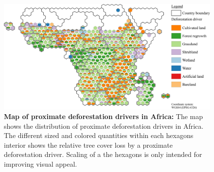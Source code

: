 			\begin{figure}[ht]
				\centering
				\includegraphics[scale=1]{img/africa_driver_frameless}
				\caption[Map of proximate deforestion drivers in Africa]{\textbf{Map of proximate deforestation drivers in Africa:} The map shows the distribution of proximate deforestation drivers in Africa. The different sized and colored quantities within each hexagons interior shows the relative tree cover loss by a proximate deforestation driver. Scaling of a the hexagons is only intended for improving visual appeal.}
				\label{fig:africa_driver}
			\end{figure}

